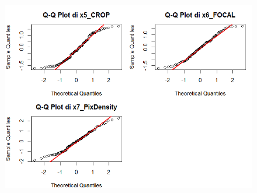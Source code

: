 \begin{figure}[H]
	\centering
	\includegraphics[width=0.9\linewidth]{graphs/DescriptiveStatisticPlots/qqplot1/qqplot2}
	\label{fig:qqplot2}
\end{figure}

